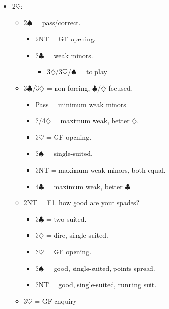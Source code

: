 \documentclass[a4paper,14pt]{extarticle}
\begin{document}
\begin{itemize}
\item 2$\heartsuit$:
	\begin{itemize}
   \item 2$\spadesuit$ = pass/correct.
		\begin{itemize}
      \item 2NT = GF opening.
      \item 3$\clubsuit$ = weak minors.
			\begin{itemize}
			\item 3$\diamondsuit$/3$\heartsuit$/$\spadesuit$ = to play
			\end{itemize}
		\end{itemize}
   \item 3$\clubsuit$/3$\diamondsuit$ = non-forcing, $\clubsuit$/$\diamondsuit$-focused.
		\begin{itemize}
		\item Pass = minimum weak minors
      \item 3/4$\diamondsuit$ = maximum weak, better $\diamondsuit$.
      \item 3$\heartsuit$ = GF opening.
      \item 3$\spadesuit$ = single-suited.
      \item 3NT = maximum weak minors, both equal.
      \item 4$\clubsuit$ = maximum weak, better $\clubsuit$.
		\end{itemize}
   \item 2NT = F1, how good are your spades?
		\begin{itemize}
      \item 3$\clubsuit$ = two-suited.
      \item 3$\diamondsuit$ = dire, single-suited.
      \item 3$\heartsuit$ = GF opening.
      \item 3$\spadesuit$ = good, single-suited, points spread.
      \item 3NT = good, single-suited, running suit.
		\end{itemize}
	\item 3$\heartsuit$ = GF enquiry
	\end{itemize}

\newpage


\end{itemize}
\end{document}
